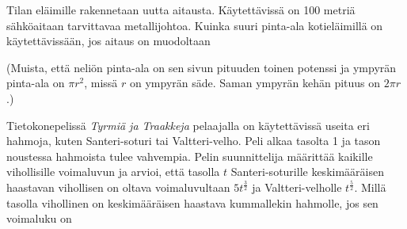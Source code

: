 \begin{tehtavasivu}
\begin{tehtava}%
Tilan eläimille rakennetaan uutta aitausta. Käytettävissä on 100 metriä sähköaitaan tarvittavaa metallijohtoa. Kuinka suuri pinta-ala kotieläimillä on käytettävissään, jos aitaus on muodoltaan
\begin{alakohdat}
\end{alakohdat}
(Muista, että neliön pinta-ala on sen sivun pituuden toinen potenssi ja ympyrän pinta-ala on \(\pi r^2\), missä \(r\) on ympyrän säde. Saman ympyrän kehän pituus on \(2\pi r\).)
\begin{vastaus}
\begin{alakohdat}
\end{alakohdat}
\end{vastaus}
\end{tehtava}

\begin{tehtava}
Tietokonepelissä \emph{Tyrmiä ja Traakkeja} pelaajalla on käytettävissä useita eri hahmoja,
kuten Santeri-soturi tai Valtteri-velho. Peli alkaa tasolta 1 ja tason noustessa hahmoista
tulee vahvempia. Pelin suunnittelija määrittää kaikille vihollisille voimaluvun ja arvioi,
että tasolla $t$ Santeri-soturille keskimääräisen haastavan vihollisen on oltava
voimaluvultaan $5t^{\frac{3}{2}}$ ja Valtteri-velholle $t^{\frac{5}{2}}$. Millä tasolla
vihollinen on keskimääräisen haastava kummallekin hahmolle, jos sen voimaluku on
\begin{alakohdat}
\end{alakohdat}
\begin{vastaus}
\begin{alakohdat}
\end{alakohdat}
\end{vastaus}
\end{tehtava}

\end{tehtavasivu}

